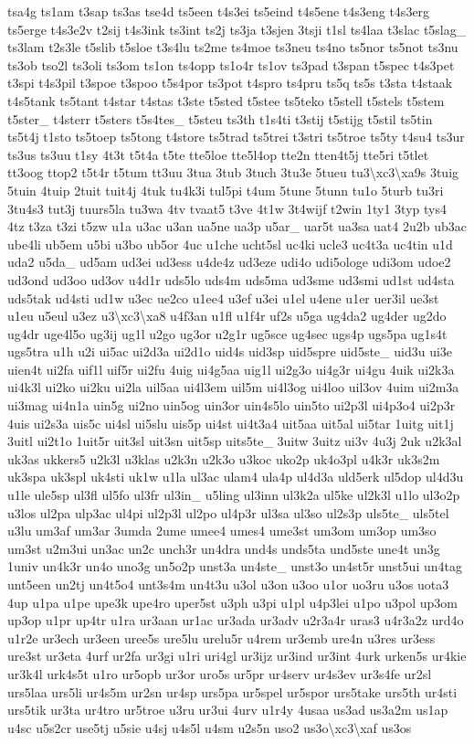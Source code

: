 {tsa4g ts1am t3sap ts3as tse4d ts5een t4s3ei ts5eind t4s5ene t4s3eng t4s3erg ts5erge t4s3e2v t2sij t4s3ink ts3int ts2j ts3ja t3sjen 3tsji t1sl ts4laa t3slac t5slag\-\_\- ts3lam t2s3le t5slib t5sloe t3s4lu ts2me ts4moe ts3neu ts4no ts5nor ts5not ts3nu ts3ob tso2l ts3oli ts3om ts1on ts4opp ts1o4r ts1ov ts3pad t3span t5spec t4s3pet t3spi t4s3pil t3spoe t3spoo t5s4por ts3pot t4spro ts4pru ts5q ts5s t3sta t4staak t4s5tank ts5tant t4star t4stas t3ste t5sted t5stee ts5teko t5stell t5stels t5stem t5ster\-\_\- t4sterr t5sters t5s4tes\-\_\- t5steu ts3th t1s4ti t3stij t5stijg t5stil ts5tin ts5t4j t1sto ts5toep ts5tong t4store ts5trad ts5trei t3stri ts5troe ts5ty t4su4 ts3ur ts3us ts3uu t1sy 4t3t t5t4a t5te tte5loe tte5l4op tte2n tten4t5j tte5ri t5tlet tt3oog ttop2 t5t4r t5tum tt3uu 3tua 3tub 3tuch 3tu3e 5tueu tu3\textbackslash{}xc3\textbackslash{}xa9s 3tuig 5tuin 4tuip 2tuit tuit4j 4tuk tu4k3i tul5pi t4um 5tune 5tunn tu1o 5turb tu3ri 3tu4s3 tut3j tuurs5la tu3wa 4tv tvaat5 t3ve 4t1w 3t4wijf t2win 1ty1 3typ tys4 4tz t3za t3zi t5zw u1a u3ac u3an ua5ne ua3p u5ar\-\_\- uar5t ua3sa uat4 2u2b ub3ac ube4li ub5em u5bi u3bo ub5or 4uc u1che ucht5sl uc4ki ucle3 uc4t3a uc4tin u1d uda2 u5da\-\_\- ud5am ud3ei ud3ess u4de4z ud3eze udi4o udi5ologe udi3om udoe2 ud3ond ud3oo ud3ov u4d1r uds5lo uds4m uds5ma ud3sme ud3smi ud1st ud4sta uds5tak ud4sti ud1w u3ec ue2co u1ee4 u3ef u3ei u1el u4ene u1er uer3il ue3st u1eu u5eul u3ez u3\textbackslash{}xc3\textbackslash{}xa8 u4f3an u1fl u1f4r uf2s u5ga ug4da2 ug4der ug2do ug4dr uge4l5o ug3ij ug1l u2go ug3or u2g1r ug5sce ug4sec ugs4p ugs5pa ug1s4t ugs5tra u1h u2i ui5ac ui2d3a ui2d1o uid4s uid3sp uid5spre uid5ste\-\_\- uid3u ui3e uien4t ui2fa uif1l uif5r ui2fu 4uig ui4g5aa uig1l ui2g3o ui4g3r ui4gu 4uik ui2k3a ui4k3l ui2ko ui2ku ui2la uil5aa ui4l3em uil5m ui4l3og ui4loo uil3ov 4uim ui2m3a ui3mag ui4n1a uin5g ui2no uin5og uin3or uin4s5lo uin5to ui2p3l ui4p3o4 ui2p3r 4uis ui2s3a uis5c ui4sl ui5slu uis5p ui4st ui4t3a4 uit5aa uit5al ui5tar 1uitg uit1j 3uitl ui2t1o 1uit5r uit3sl uit3sn uit5sp uits5te\-\_\- 3uitw 3uitz ui3v 4u3j 2uk u2k3al uk3as ukkers5 u2k3l u3klas u2k3n u2k3o u3koc uko2p uk4o3pl u4k3r uk3s2m uk3spa uk3spl uk4sti uk1w u1la ul3ac ulam4 ula4p ul4d3a uld5erk ul5dop ul4d3u u1le ule5sp ul3fl ul5fo ul3fr ul3in\-\_\- u5ling ul3inn ul3k2a ul5ke ul2k3l u1lo ul3o2p u3los ul2pa ulp3ac ul4pi ul2p3l ul2po ul4p3r ul3sa ul3so ul2s3p uls5te\-\_\- uls5tel u3lu um3af um3ar 3umda 2ume umee4 umes4 ume3st um3om um3op um3so um3st u2m3ui un3ac un2c unch3r un4dra und4s unds5ta und5ste une4t un3g 1univ un4k3r un4o uno3g un5o2p unst3a un4ste\-\_\- unst3o un4st5r unst5ui un4tag unt5een un2tj un4t5o4 unt3s4m un4t3u u3ol u3on u3oo u1or uo3ru u3os uota3 4up u1pa u1pe upe3k upe4ro uper5st u3ph u3pi u1pl u4p3lei u1po u3pol up3om up3op u1pr up4tr u1ra ur3aan ur1ac ur3ada ur3adv u2r3a4r uras3 u4r3a2z urd4o u1r2e ur3ech ur3een uree5s ure5lu urelu5r u4rem ur3emb ure4n u3res ur3ess ure3st ur3eta 4urf ur2fa ur3gi u1ri uri4gl ur3ijz ur3ind ur3int 4urk urken5s ur4kie ur3k4l urk4s5t u1ro ur5opb ur3or uro5s ur5pr ur4serv ur4s3ev ur3s4fe ur2sl urs5laa urs5li ur4s5m ur2sn ur4sp urs5pa ur5spel ur5spor urs5take urs5th ur4sti urs5tik ur3ta ur4tro ur5troe u3ru ur3ui 4urv u1r4y 4usaa us3ad us3a2m us1ap u4sc u5s2cr use5tj u5sie u4sj u4s5l u4sm u2s5n uso2 us3o\textbackslash{}xc3\textbackslash{}xaf us3os }
